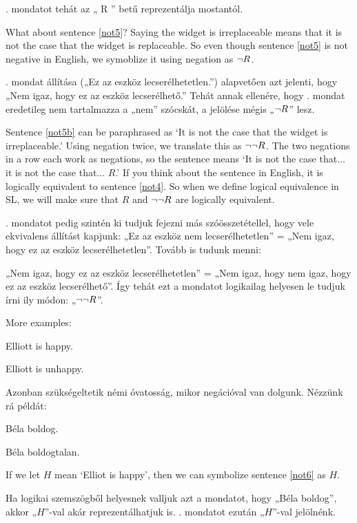. mondatot tehát az „ R ” betű reprezentálja mostantól. 

What about sentence \ref{not5}? Saying the widget is irreplaceable means that it is not the case that the widget is replaceable. So even though sentence \ref{not5} is not negative in English, we symoblize it using negation as $\neg{R}$.

. mondat állítása („Ez az eszköz lecserélhetetlen.”) alapvetően azt jelenti, hogy „Nem igaz, hogy ez az eszköz lecserélhető.” Tehát annak ellenére, hogy . mondat eredetileg nem tartalmazza a „nem” szócskát, a jelölése mégis „$\neg{R}$” lesz.

Sentence \ref{not5b} can be paraphrased as `It is not the case that the widget is irreplaceable.' Using negation twice, we translate this as $\neg\neg R$. The two negations in a row each work as negations, so the sentence means `It is not the case that$\ldots$ it is not the case that$\ldots$ $R$.' If you think about the sentence in English, it is logically equivalent to sentence \ref{not4}. So when we define logical equivalence in SL, we will make sure that $R$ and $\neg\neg R$ are logically equivalent.

. mondatot pedig szintén ki tudjuk fejezni más szóösszetétellel, hogy vele ekvivalens állítást kapjunk: „Ez az eszköz nem lecserélhetetlen” = „Nem igaz, hogy ez az eszköz lecserélhetetlen”.
Tovább is tudunk menni:

„Nem igaz, hogy ez az eszköz lecserélhetetlen” = „Nem igaz, hogy nem igaz, hogy ez az eszköz lecserélhető”.  Így tehát ezt a mondatot logikailag helyesen le tudjuk írni ily módon: „$\neg\neg R$”.

More examples:
\begin{earg}
\item[\ex{not6}] Elliott is happy.
\item[\ex{not7}] Elliott is unhappy.
\end{earg}

Azonban szükségeltetik némi óvatosság, mikor negációval van dolgunk. Nézzünk rá példát:
\begin{earg}
\item[\ex{not6}] Béla boldog.
\item[\ex{not7}] Béla boldogtalan.
\end{earg}


If we let $H$ mean `Elliot is happy', then we can symbolize sentence \ref{not6} as $H$.

Ha logikai szemszögből helyesnek valljuk azt a mondatot, hogy „Béla boldog”, akkor „$H$”-val akár reprezentálhatjuk is.
. mondatot ezután „$H$”-val jelölnénk.

